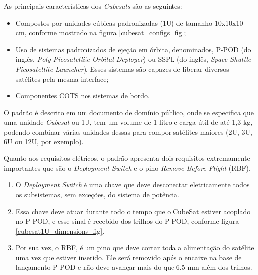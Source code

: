 As principais características dos \textit{Cubesats} são as seguintes:
\begin{itemize}
    \item Compostos por unidades cúbicas padronizadas (1U) de tamanho 10x10x10 cm, conforme mostrado na figura \ref{cubesat_configs_fig};
    \item Uso de sistemas padronizados de ejeção em órbita, denominados, P-POD (do inglês, \textit{Poly Picosatellite Orbital Deployer}) ou SSPL (do inglês, \textit{Space Shuttle Picosatellite Launcher}). Esses sistemas são capazes de liberar diversos satélites pela mesma interface;
    \item Componentes COTS nos sistemas de bordo.
\end{itemize}

\noindent
\begin{minipage}{\linewidth}
\label{cubesat_configs_fig}
\end{minipage}

O padrão é descrito em um documento de domínio público\cite{cubesat_specs_rev13}, onde se especifica que uma unidade \textit{Cubesat} ou 1U, tem um volume de 1 litro e carga útil de até 1,3 kg, podendo combinar várias unidades dessas para compor satélites maiores (2U, 3U, 6U ou 12U, por exemplo).

Quanto aos requisitos elétricos, o padrão apresenta dois requisitos extremamente importantes que são o \textit{Deployment Switch} e o pino \textit{Remove Before Flight} (RBF).
\begin{enumerate}
    \item O \textit{Deployment Switch} é uma chave que deve desconectar eletricamente todos os subsistemas, sem exceções, do sistema de potência.
    \item Essa chave deve atuar durante todo o tempo que o CubeSat estiver acoplado no P-POD, e esse sinal é recebido dos trilhos do P-POD, conforme figura \ref{cubesat1U_dimensions_fig}.
    \item Por sua vez, o RBF, é um pino que deve cortar toda a alimentação do satélite uma vez que estiver inserido. Ele será removido após o encaixe na base de lançamento P-POD e não deve avançar mais do que 6.5 mm além dos trilhos.
\end{enumerate}

